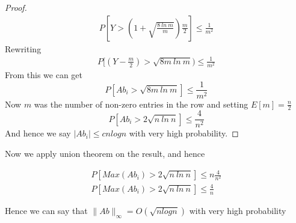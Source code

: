 \documentclass{assignment}
\begin{document}
\begin{problemlist}
\begin{problem}
\begin{answer}
\begin{proof}
\begin{eqnarray}
P [Y > (1+ \sqrt{\frac{8 \:ln \: m}{m}}) \frac{m}{2}] \leq \frac{1}{m^2}
\end{eqnarray}
Rewriting
\begin{eqnarray}
P [(Y - \frac{m}{2}) > \sqrt{8m \:ln \: m})  \leq \frac{1}{m^2}
\end{eqnarray}
From this we can get
\begin{equation}
 P[Ab_i>\sqrt{8m \:ln \: m}] \leq \frac{1}{m^2}
\end{equation}
Now $m$ was the number of non-zero entries in the row and setting $E[m]=\frac{n}{2}$
\begin{equation}
 P[Ab_i>2\sqrt{n \:ln \: n}] \leq \frac{4}{n^2}
\end{equation}
And hence we say $|Ab_i| \leq c nlogn$ with very high probability.
\end{proof}
 
Now we apply union theorem on the result, and hence 

 \begin{eqnarray}
 P[Max(Ab_i)>2\sqrt{n \:ln \: n}] \leq n \frac{4}{n^2} \\
 P[Max(Ab_i)>2\sqrt{n \:ln \: n}] \leq  \frac{4}{n}
\end{eqnarray}

Hence we can say that $\|Ab\|_\infty = O(\sqrt{n log n})$ with very high probability 


\end{answer}

\end{problem}


\end{problemlist}
\end{document}
